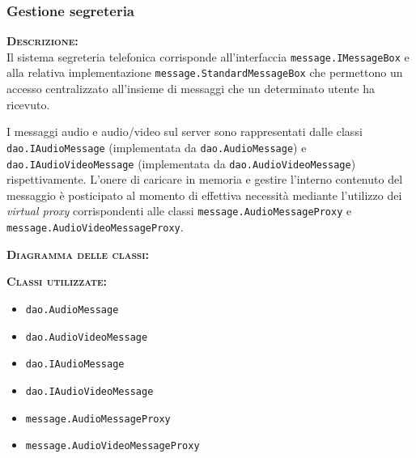 \subsubsection{Gestione segreteria}
\begin{description}
	\item{\scshape\bfseries Descrizione:}\\
Il sistema segreteria telefonica corrisponde all'interfaccia \texttt{message.IMessageBox} e alla relativa implementazione \texttt{message.StandardMessageBox} che permettono un accesso centralizzato all'insieme di messaggi che un determinato utente ha ricevuto.

I messaggi audio e audio/video sul server sono rappresentati dalle classi \texttt{dao.IAudioMessage} (implementata da \texttt{dao.AudioMessage}) e \texttt{dao.IAudioVideoMessage} (implementata da \texttt{dao.AudioVideoMessage}) rispettivamente. L'onere di caricare in memoria e gestire l'interno contenuto del messaggio è posticipato al momento di effettiva necessità mediante l'utilizzo dei \textit{virtual proxy} corrispondenti alle classi \texttt{message.AudioMessageProxy} e \texttt{message.AudioVideoMessageProxy}.
	\item{\scshape\bfseries Diagramma delle classi:}
	\item{\scshape\bfseries Classi utilizzate:}
\begin{itemize}
  \item \texttt{dao.AudioMessage}
  \item \texttt{dao.AudioVideoMessage}
  \item \texttt{dao.IAudioMessage}
  \item \texttt{dao.IAudioVideoMessage}
  \item \texttt{message.AudioMessageProxy}
  \item \texttt{message.AudioVideoMessageProxy}
\end{itemize}
\end{description}

